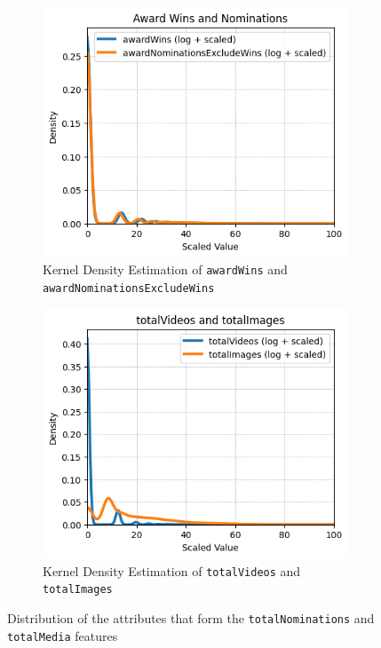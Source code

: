 \begin{figure}[H]
    \centering
    \begin{subfigure}{0.41\textwidth}
        \includegraphics[width=\textwidth]{plots/nominations_distrib.png}
        \captionsetup{width=0.9\linewidth, justification=centering}
        \caption{Kernel Density Estimation of \texttt{awardWins} and \texttt{awardNominationsExcludeWins}}
        \label{fig:sub1}
    \end{subfigure}
    \begin{subfigure}{0.41\textwidth}
        \includegraphics[width=\textwidth]{plots/totalVideos_Images_distrib.png}
        \captionsetup{width=0.9\linewidth, justification=centering}
        \caption{Kernel Density Estimation of \texttt{totalVideos} and \texttt{totalImages}}
        \label{fig:sub2}
    \end{subfigure}
    \captionsetup{justification=centering}
    \caption{Distribution of the attributes that form the \texttt{totalNominations} and \texttt{totalMedia} features}
    \label{fig:distrib}
\end{figure}

